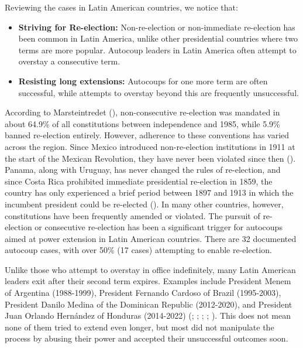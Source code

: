 \documentclass[
  12pt,
]{report}
\begin{document}
Reviewing the cases in Latin American countries, we notice that:

\begin{itemize}
\item
  \textbf{Striving for Re-election:} Non-re-election or non-immediate
  re-election has been common in Latin America, unlike other
  presidential countries where two terms are more popular. Autocoup
  leaders in Latin America often attempt to overstay a consecutive term.
\item
  \textbf{Resisting long extensions:} Autocoups for one more term are
  often successful, while attempts to overstay beyond this are
  frequently unsuccessful.
\end{itemize}

According to Marsteintredet (),
non-consecutive re-election was mandated in about 64.9\% of all
constitutions between independence and 1985, while 5.9\% banned
re-election entirely. However, adherence to these conventions has varied
across the region. Since Mexico introduced non-re-election institutions
in 1911 at the start of the Mexican Revolution, they have never been
violated since then (). Panama,
along with Uruguay, has never changed the rules of re-election, and
since Costa Rica prohibited immediate presidential re-election in 1859,
the country has only experienced a brief period between 1897 and 1913 in
which the incumbent president could be re-elected
(). In many other
countries, however, constitutions have been frequently amended or
violated. The pursuit of re-election or consecutive re-election has been
a significant trigger for autocoups aimed at power extension in Latin
American countries. There are 32 documented autocoup cases, with over
50\% (17 cases) attempting to enable re-election.

Unlike those who attempt to overstay in office indefinitely, many Latin
American leaders exit after their second term expires. Examples include
President Menem of Argentina (1988-1999), President Fernando Cardoso of
Brazil (1995-2003), President Danilo Medina of the Dominican Republic
(2012-2020), and President Juan Orlando Hernández of Honduras
(2014-2022) (;
;
;
; ). This does not mean none of them tried to extend even
longer, but most did not manipulate the process by abusing their power
and accepted their unsuccessful outcomes soon.
\end{document}
